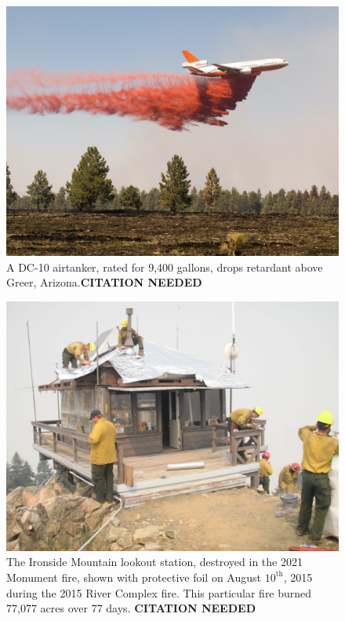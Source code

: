 \documentclass[]             %
{NASA}                       %
\theoremstyle{definition}
\begin{document}

\begin{figure}[h]
  \centering
  \includegraphics[scale=0.4]{images/dc10.jpg}
  \caption{A DC-10 airtanker, rated for 9,400 gallons, drops retardant above Greer, Arizona.\textbf{CITATION NEEDED}}
\end{figure}

\begin{figure}[h]
  \centering
  \includegraphics[scale=0.085]{images/ironside.jpg}
  \caption{The Ironside Mountain lookout station, destroyed in the 2021
    Monument fire, shown with protective foil on August
    $10^\textrm{th}$, 2015 during the 2015 River Complex fire. This
    particular fire burned 77,077 acres over 77 days. \textbf{CITATION NEEDED}}
\end{figure}
\end{document}
